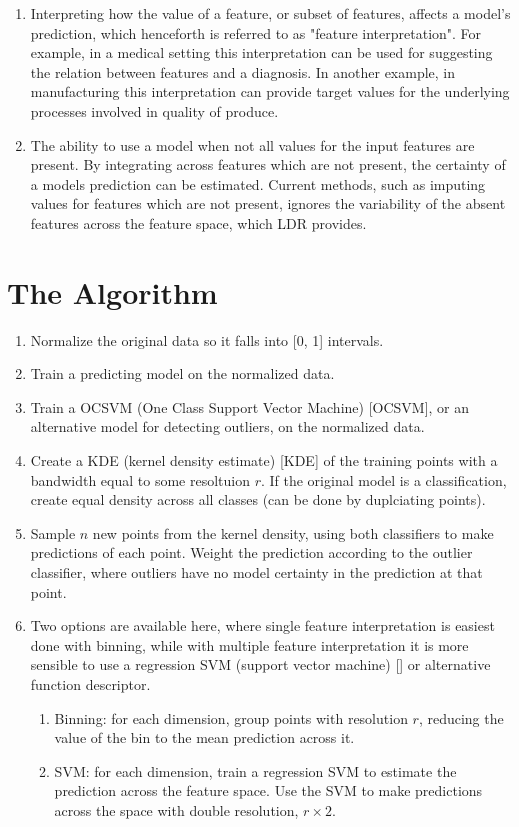 \documentclass[a4paperpaper,twocolumn]{article}
\begin{document}
\begin{enumerate}
\item Interpreting how the value of a feature, or subset of features, affects a model's prediction, which henceforth is referred to as "feature interpretation". For example, in a medical setting this interpretation can be used for suggesting the relation between features and a diagnosis. In another example, in manufacturing this interpretation can provide target values for the underlying processes involved in quality of produce.

\item The ability to use a model when not all values for the input features are present. By integrating across features which are not present, the certainty of a models prediction can be estimated. Current methods, such as imputing values for features which are not present, ignores the variability of the absent features across the feature space, which LDR provides.
\end{enumerate}

\section{The Algorithm}

\begin{enumerate}
\item Normalize the original data so it falls into [0, 1] intervals.
\item Train a predicting model on the normalized data.
\item Train a OCSVM (One Class Support Vector Machine) [OCSVM], or an alternative model for detecting outliers, on the normalized data.
\item Create a KDE (kernel density estimate) [KDE] of the training points with a bandwidth equal to some resoltuion $r$. If the original model is a classification, create equal density across all classes (can be done by duplciating points).
\item Sample $n$ new points from the kernel density, using both classifiers to make predictions of each point. Weight the prediction according to the outlier classifier, where outliers have no model certainty in the prediction at that point.
\item Two options are available here, where single feature interpretation is easiest done with binning, while with multiple feature interpretation it is more sensible to use a regression SVM (support vector machine) [] or alternative function descriptor.
    \begin{enumerate}
        \item Binning: for each dimension, group points with resolution $r$, reducing the value of the bin to the mean prediction across it.
        \item SVM: for each dimension, train a regression SVM to estimate the prediction across the feature space. Use the SVM to make predictions across the space with double resolution, $r \times 2$.
    \end{enumerate}
\end{enumerate}
\end{document}
